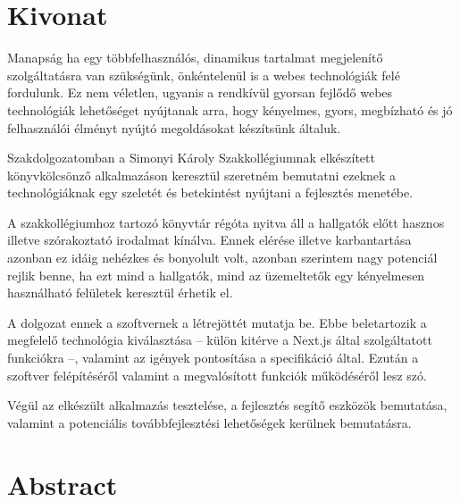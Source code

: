 \setcounter{page}{1}

\selecthungarian

\chapter*{Kivonat}

Manapság ha egy többfelhasználós, dinamikus tartalmat megjelenítő szolgáltatásra van szükségünk, önkéntelenül is a webes technológiák
felé fordulunk. Ez nem véletlen, ugyanis a rendkívül gyorsan fejlődő webes technológiák lehetőséget nyújtanak
arra, hogy kényelmes, gyors, megbízható és jó felhasználói élményt nyújtó megoldásokat készítsünk általuk.

Szakdolgozatomban a Simonyi Károly Szakkollégiumnak elkészített könyvkölcsönző alkalmazáson keresztül szeretném bemutatni
ezeknek a technológiáknak egy szeletét és betekintést nyújtani a fejlesztés menetébe.

A szakkollégiumhoz tartozó könyvtár régóta nyitva áll a hallgatók előtt hasznos illetve szórakoztató irodalmat kínálva.
Ennek elérése illetve karbantartása azonban ez idáig nehézkes és bonyolult volt, azonban szerintem nagy potenciál rejlik benne,
ha ezt mind a hallgatók, mind az üzemeltetők egy kényelmesen használható felületek keresztül érhetik el.

A dolgozat ennek a szoftvernek a létrejöttét mutatja be. Ebbe beletartozik a megfelelő technológia kiválasztása -- külön kitérve a
Next.js által szolgáltatott funkciókra --, valamint az igények pontosítása a specifikáció által.
Ezután a szoftver felépítéséről valamint a megvalósított funkciók működéséről lesz szó.

Végül az elkészült alkalmazás tesztelése, a fejlesztés segítő eszközök bemutatása, valamint a potenciális továbbfejlesztési
lehetőségek kerülnek bemutatásra.


\vfill
\selectenglish


\chapter*{Abstract}


